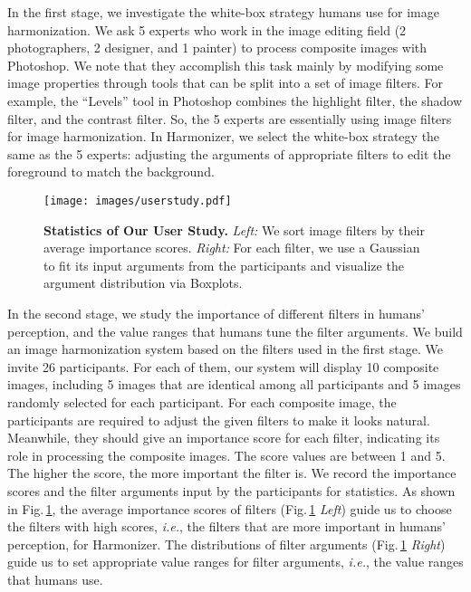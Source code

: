 \documentclass[runningheads]{llncs}
\newcommand{\ke}[1]{{\color{black}#1}}
\begin{document}
In the first stage, we investigate the white-box strategy humans use for image harmonization. We ask 5 experts who work in the image editing field (2 photographers, \ke{2} designer, and 1 painter) to process \ke{composite} images with Photoshop. We note that they accomplish this task \ke{mainly} by modifying some image properties through tools that can be split into a set of image filters. For example, the \ke{``Levels''} tool in Photoshop combines the highlight filter, the shadow filter, and the contrast filter. So, the 5 experts are essentially using image filters for image harmonization. In Harmonizer, we select the white-box strategy the same as the 5 experts: adjusting the arguments of appropriate filters to edit the foreground to match the background.

 \begin{figure}[t]
\centering
\texttt{[image: images/userstudy.pdf]}
{\begin{center}
\vspace{-0.5cm}
\caption{\textbf{Statistics of Our User Study.} {\it Left:} We sort image filters by their average importance scores. {\it Right:} For each filter, we use a Gaussian to fit its input arguments from the participants and visualize the argument distribution via Boxplots.}
\label{fig:userstudy}
\end{center}
}
\vspace{-0.7cm}
\end{figure}

In the second stage, we study the importance of different filters in humans' perception, and the value ranges that humans tune the filter arguments.
We build an image harmonization system based on the filters used in the first stage. We invite 26 participants. For each of them, our system will display 10 composite images, including 5 images that are identical among all participants and 5 images randomly selected for each participant. For each composite image, the participants are required to adjust the given filters to make it looks natural. Meanwhile, they should give an importance score for each filter, indicating its role in processing the \ke{composite} images. The score values are between 1 and 5. The higher the score, the more important the filter is. We record the importance scores and the filter arguments input by the participants for statistics. As shown in Fig.\,\ref{fig:userstudy}, the average importance scores of filters (Fig.\,\ref{fig:userstudy} {\it Left}) guide us to choose the filters with high scores, {\it i.e.}, the filters that are more important in humans' perception, for Harmonizer. The distributions of filter arguments (Fig.\,\ref{fig:userstudy} {\it Right})  guide us to set appropriate value ranges for filter arguments, {\it i.e.}, the value ranges that humans use.
\end{document}
